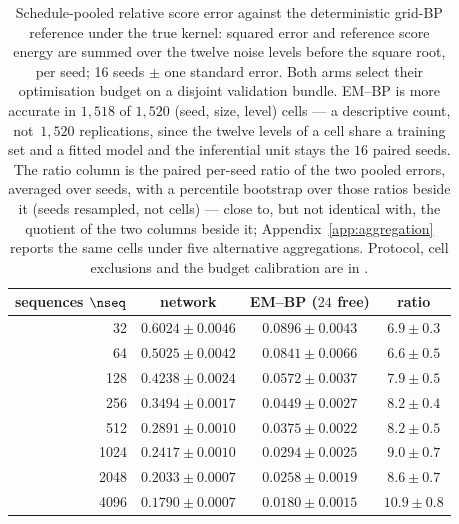 
\begin{table}[!htbp]
\caption[Relative denoising error against training-set size]{Schedule-pooled relative score error against the deterministic grid-BP
reference under the true kernel: squared error and reference score energy are summed over the
twelve noise levels before the square root, per seed; 16 seeds $\pm$ one standard error.
Both arms select their optimisation budget on a disjoint validation bundle. EM--BP is
more accurate in $1{,}518$ of $1{,}520$ (seed, size, level) cells --- a
descriptive count, not $\,1{,}520$ replications, since the twelve levels of a
cell share a training set and a fitted model and the inferential unit stays the
$16$ paired seeds. The ratio
column is the paired per-seed ratio of the two pooled errors, averaged over seeds,
with a percentile bootstrap over those ratios beside it (seeds resampled, not
cells) --- close to, but
not identical with, the quotient of the two columns beside it;
Appendix~\ref{app:aggregation} reports the same cells under five alternative aggregations.
Protocol, cell exclusions and the budget calibration are in \provenanceappendix.}
\label{tab:pointwise}
\centering
\setlength{\tabcolsep}{4pt}
\begin{tabular}{rccc}
\toprule
sequences $\nseq$ & network & EM--BP ($24$ free) & ratio \\
\midrule
32   & $0.6024 \pm 0.0046$ & $\mathbf{0.0896 \pm 0.0043}$ & $6.9 \pm 0.3$ \\
64   & $0.5025 \pm 0.0042$ & $\mathbf{0.0841 \pm 0.0066}$ & $6.6 \pm 0.5$ \\
128  & $0.4238 \pm 0.0024$ & $\mathbf{0.0572 \pm 0.0037}$ & $7.9 \pm 0.5$ \\
256  & $0.3494 \pm 0.0017$ & $\mathbf{0.0449 \pm 0.0027}$ & $8.2 \pm 0.4$ \\
512  & $0.2891 \pm 0.0010$ & $\mathbf{0.0375 \pm 0.0022}$ & $8.2 \pm 0.5$ \\
1024 & $0.2417 \pm 0.0010$ & $\mathbf{0.0294 \pm 0.0025}$ & $9.0 \pm 0.7$ \\
2048 & $0.2033 \pm 0.0007$ & $\mathbf{0.0258 \pm 0.0019}$ & $8.6 \pm 0.7$ \\
4096 & $0.1790 \pm 0.0007$ & $\mathbf{0.0180 \pm 0.0015}$ & $10.9 \pm 0.8$ \\
\bottomrule
\end{tabular}
\end{table}
